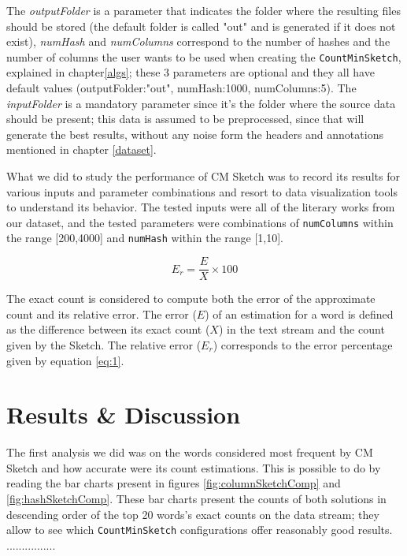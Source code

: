 \documentclass[shortpaper]{revdetua}
\begin{document}
The \textit{outputFolder} is a parameter that indicates the folder where the resulting files should be stored (the default folder is called "out" and is 
generated if it does not exist), \textit{numHash} and \textit{numColumns} correspond to the number of hashes and the number of columns the user wants to be used 
when creating the \texttt{CountMinSketch}, explained in chapter\ref{algs}; these 3 parameters are optional and they all have default values 
(outputFolder:"out", numHash:1000, numColumns:5).
The \textit{inputFolder} is a mandatory parameter since it's the folder where the source data should be present; this data is assumed to be preprocessed, 
since that will generate the best results, without any noise form the headers and annotations mentioned in chapter \ref{dataset}.
\newline

What we did to study the performance of CM Sketch was to record its results for various inputs and parameter combinations and resort to data visualization tools 
to understand its behavior.
The tested inputs were all of the literary works from our dataset, and the tested parameters were combinations of \texttt{numColumns} within the range [200,4000] 
and \texttt{numHash} within the range [1,10].

\begin{equation}
    E_{r} = \frac{E}{X} \times 100
    \label{eq:1}
\end{equation}

\newpage
The exact count is considered to compute both the error of the approximate count and its relative error.
The error ($E$) of an estimation for a word is defined as the difference between its exact count ($X$) in the text stream and the count given by the Sketch.
The relative error ($E_r$) corresponds to the error percentage given by equation \ref{eq:1}.

\section{Results \& Discussion} %

The first analysis we did was on the words considered most frequent by CM Sketch and how accurate were its count estimations.
This is possible to do by reading the bar charts present in figures \ref{fig:columnSketchComp} and \ref{fig:hashSketchComp}.
These bar charts present the counts of both solutions in descending order of the top 20 words's exact counts on the data stream; 
they allow to see which \texttt{CountMinSketch} configurations offer reasonably good results.
................
\end{document}
